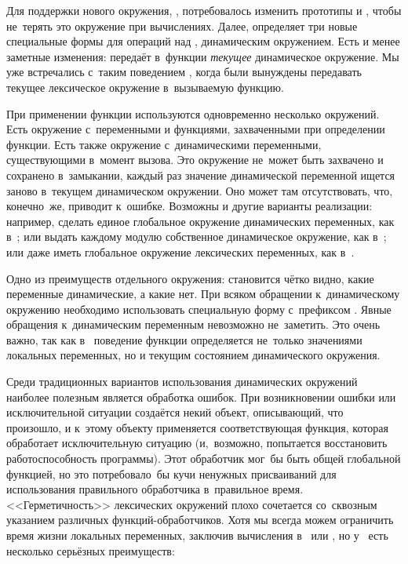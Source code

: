 Для поддержки нового окружения, , потребовалось изменить прототипы
 и , чтобы не~терять это окружение при
вычислениях. Далее,  определяет три новые специальные формы
для операций над , динамическим окружением. Есть и менее заметные
изменения:  передаёт в~функции \emph{текущее}
динамическое окружение. Мы уже встречались с~таким поведением
, когда
были вынуждены передавать текущее лексическое окружение в~вызываемую функцию.

При применении функции используются одновременно несколько окружений. Есть
окружение с~переменными и функциями, захваченными при определении функции. Есть
также окружение с~динамическими переменными, существующими в~момент вызова. Это
окружение не~может быть захвачено и сохранено в~замыкании, каждый раз значение
динамической переменной ищется заново в~текущем динамическом окружении. Оно
может там отсутствовать, что, конечно~же, приводит к~ошибке. Возможны и другие
варианты реализации: например, сделать единое глобальное окружение динамических
переменных, как в~{\ISLisp}; или выдать каждому модулю собственное динамическое
окружение, как в~{\EuLisp}; или даже иметь глобальное окружение лексических
переменных, как в~{\CommonLisp}.

Одно из преимуществ отдельного окружения: становится чётко видно, какие
переменные динамические, а какие нет. При всяком обращении к~динамическому
окружению необходимо использовать специальную форму с~префиксом .
Явные обращения к~динамическим переменным невозможно не~заметить. Это очень
важно, так как в~ поведение функции определяется не~только значениями
локальных переменных, но и текущим состоянием динамического окружения. 

Среди традиционных вариантов использования динамических окружений наиболее
полезным является обработка ошибок. При возникновении ошибки или исключительной
ситуации создаётся некий объект, описывающий, что произошло, и к~этому объекту
применяется соответствующая функция, которая обработает исключительную ситуацию
(и,~возможно, попытается восстановить работоспособность программы). Этот
обработчик мог~бы быть общей глобальной функцией, но это потребовало~бы кучи
ненужных присваиваний для использования правильного обработчика в~правильное
время. <<Герметичность>> лексических окружений плохо сочетается со~сквозным
указанием различных функций-обработчиков. Хотя мы всегда можем ограничить время
жизни локальных переменных, заключив вычисления в~ или ,
но у~ есть несколько серьёзных преимуществ:

